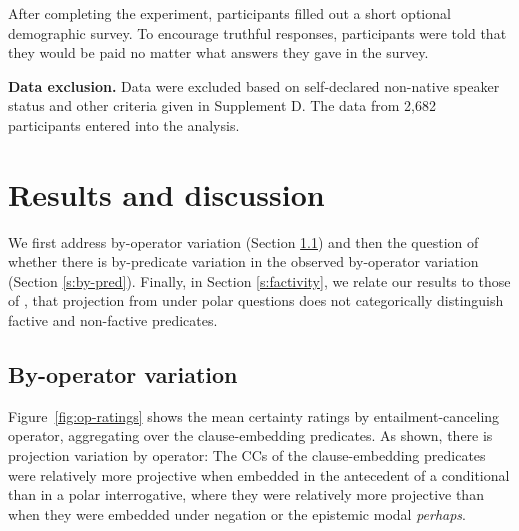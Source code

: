 \documentclass[a4paper,12pt,twoside]{article}
\begin{document}
            After completing the experiment, participants filled out a short optional demographic survey. To encourage truthful responses, participants were told that they would be paid no matter what answers they gave in the survey.

        \noindent\textbf{Data exclusion.} Data were excluded based on self-declared non-native speaker status and other criteria given in Supplement D. The data from 2,682 participants entered into the analysis.

\section{Results and discussion}

        We first address by-operator variation (Section \ref{s:by-op}) and then the question of whether there is by-predicate variation in the observed by-operator variation (Section \ref{s:by-pred}). Finally, in Section \ref{s:factivity}, we relate our results to those of \citealt{degen_are_2022}, that projection from under polar questions does not categorically distinguish factive and non-factive predicates.
		
	\subsection{By-operator variation}\label{s:by-op}

        Figure~\ref{fig:op-ratings} shows the mean certainty ratings by entailment-canceling operator, aggregating over the clause-embedding predicates. As shown, there is projection variation by operator: The CCs of the clause-embedding predicates were relatively more projective when embedded in the antecedent of a conditional than in a polar interrogative, where they were relatively more projective than when they were embedded under negation or the epistemic modal {\em perhaps}.
        
\end{document}
